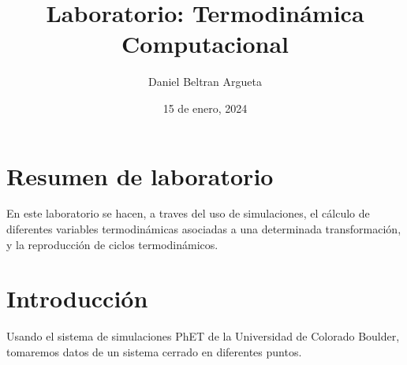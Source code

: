 \documentclass{article}
\title{Laboratorio: Termodinámica Computacional}
\author{Daniel Beltran Argueta}
\date{15 de enero, 2024}
\begin{document}
\maketitle

\section*{Resumen de laboratorio}

En este laboratorio se hacen, a traves del uso de simulaciones, el cálculo de diferentes variables termodinámicas
asociadas a una determinada transformación, y la reproducción de ciclos termodinámicos.



\section*{Introducción}

Usando el sistema de simulaciones PhET de la Universidad de Colorado Boulder, tomaremos datos de un sistema cerrado en diferentes puntos.









\end{document}

